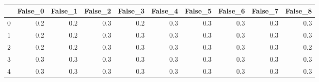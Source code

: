 \begin{tabular}{lrrrrrrrrr}
\toprule
{} &  False\_0 &  False\_1 &  False\_2 &  False\_3 &  False\_4 &  False\_5 &  False\_6 &  False\_7 &  False\_8 \\ \hline
\midrule
0 &      0.2 &      0.2 &      0.3 &      0.2 &      0.3 &      0.3 &      0.3 &      0.3 &      0.3 \\ \hline
1 &      0.2 &      0.2 &      0.3 &      0.3 &      0.3 &      0.3 &      0.3 &      0.3 &      0.3 \\ \hline
2 &      0.2 &      0.2 &      0.3 &      0.3 &      0.3 &      0.3 &      0.3 &      0.3 &      0.2 \\ \hline
3 &      0.3 &      0.3 &      0.3 &      0.3 &      0.3 &      0.3 &      0.3 &      0.3 &      0.3 \\ \hline
4 &      0.3 &      0.3 &      0.3 &      0.3 &      0.3 &      0.3 &      0.3 &      0.3 &      0.3 \\ \hline
\bottomrule
\end{tabular}
